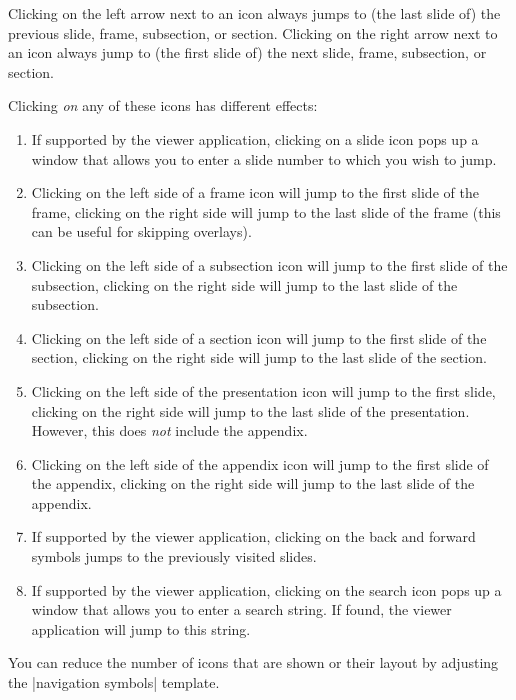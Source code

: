 Clicking on the left arrow next to an icon always jumps to (the
last slide of) the previous slide, frame, subsection, or
section. Clicking on the right arrow next to an icon always jump to
(the first slide of) the next slide, frame, subsection, or section.

Clicking \emph{on} any of these icons has different effects:
\begin{enumerate}
\item
  If supported by the viewer application, clicking on a slide icon
  pops up a window that allows you to enter a slide number to which
  you wish to jump.
\item
  Clicking on the left side of a frame icon will jump to the first
  slide of the frame, clicking on the right side will jump to the last
  slide of the frame (this can be useful for skipping overlays).
\item
  Clicking on the left side of a subsection icon will jump to the
  first slide of the subsection, clicking on the right side will jump
  to the last slide of the subsection.
\item
  Clicking on the left side of a section icon will jump to the
  first slide of the section, clicking on the right side will jump
  to the last slide of the section.
\item
  Clicking on the left side of the presentation icon will jump to the
  first slide, clicking on the right side will jump to the last slide
  of the presentation. However, this does \emph{not} include the
  appendix.
\item
  Clicking on the left side of the appendix icon will jump to the
  first slide of the appendix, clicking on the right side will jump to
  the last slide of the appendix.
\item
  If supported by the viewer application, clicking on the back and
  forward symbols jumps to the previously visited slides.
\item
  If supported by the viewer application, clicking on the search icon
  pops up a window that allows you to enter a search string. If found,
  the viewer application will jump to this string.
\end{enumerate}

You can reduce the number of icons that are shown or their layout by
adjusting the |navigation symbols| template.

